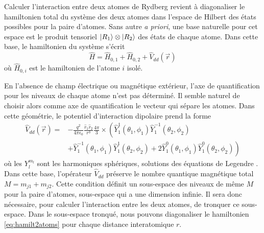 Calculer l'interaction entre deux atomes de Rydberg revient à diagonaliser le hamiltonien total du système des deux atomes dans l'espace de Hilbert des états possibles pour la paire d'atomes.
Sans autre \textit{a priori}, une base naturelle pour cet espace est le produit tensoriel $\ket{R_1}\otimes\ket{R_2}$ des états de chaque atome.
Dans cette base, le hamiltonien du système s'écrit
\begin{equation}\label{eq:hamilt2atoms}
\hat{H} = \hat{H}_{0,1} + \hat{H}_{0,2} + \hat{V}_{dd}(\vec{r})
\end{equation}
où $\hat{H}_{0,i}$ est le hamiltonien de l'atome $i$ isolé.

En l'absence de champ électrique ou magnétique extérieur, l'axe de quantification pour les niveaux de chaque atome n'est pas déterminé.
Il semble naturel de choisir alors comme axe de quantification le vecteur qui sépare les atomes.
Dans cette géométrie, le potentiel d'interaction dipolaire prend la forme
\begin{equation}\label{eq:Vdd_rr1r2}
\begin{aligned}
\hat{V}_{dd}(\vec{r})=&
-\frac{q^2}{4\pi\epsilon_0}\frac{\hat{r}_1\hat{r}_2}{r^3}\frac{4\pi}{3} \times
\left( \hat{Y}^1_1(\theta_1,\phi_1) \hat{Y}^{-1}_1(\theta_2,\phi_2) \right. \\
&\left. + \hat{Y}^{-1}_1(\theta_1,\phi_1) \hat{Y}^{1}_1(\theta_2,\phi_2)
+ 2\hat{Y}^{0}_1(\theta_1,\phi_1) \hat{Y}^{0}_1(\theta_2,\phi_2)
\right)
\end{aligned}
\end{equation}
où les $Y^{m_l}_l$ sont les harmoniques sphériques, solutions des équations de Legendre \cite{TXT_COHEN1FR}.
Dans cette base, l'opérateur $\hat{V}_{dd}$ préserve le nombre quantique magnétique total $M=m_{j1}+m_{j2}$.
Cette condition définit un sous-espace des niveaux de même $M$ pour la paire d'atomes, sous-espace qui a une dimension infinie.
Il sera donc nécessaire, pour calculer l'interaction entre les deux atomes, de tronquer ce sous-espace.
Dans le sous-espace tronqué, nous pouvons diagonaliser le hamiltonien \eqref{eq:hamilt2atoms} pour chaque distance interatomique $r$.

